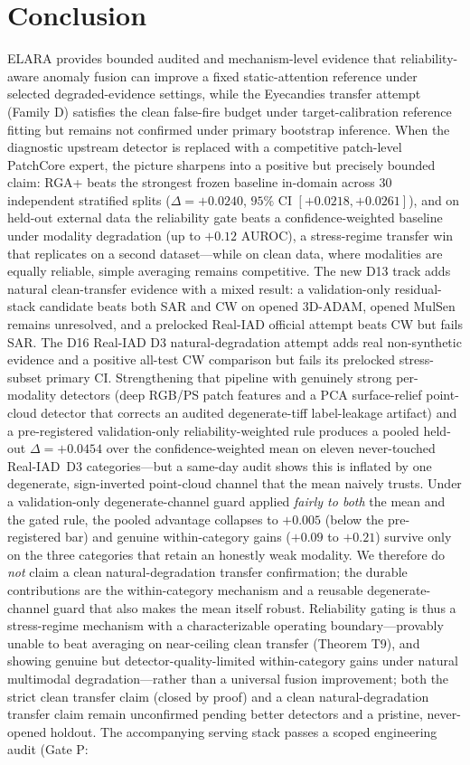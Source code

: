 \documentclass[10pt,conference]{IEEEtran}
\begin{document}
\section{Conclusion}
ELARA provides bounded audited and mechanism-level evidence that reliability-aware anomaly fusion can improve a fixed static-attention reference under selected degraded-evidence settings, while the Eyecandies transfer attempt (Family D) satisfies the clean false-fire budget under target-calibration reference fitting but remains not confirmed under primary bootstrap inference. When the diagnostic upstream detector is replaced with a competitive patch-level PatchCore expert, the picture sharpens into a positive but precisely bounded claim: RGA+ beats the strongest frozen baseline in-domain across $30$ independent stratified splits ($\Delta=+0.0240$, $95\%$ CI $[+0.0218,+0.0261]$), and on held-out external data the reliability gate beats a confidence-weighted baseline under modality degradation (up to $+0.12$ AUROC), a stress-regime transfer win that replicates on a second dataset---while on clean data, where modalities are equally reliable, simple averaging remains competitive. The new D13 track adds natural clean-transfer evidence with a mixed result: a validation-only residual-stack candidate beats both SAR and CW on opened 3D-ADAM, opened MulSen remains unresolved, and a prelocked Real-IAD official attempt beats CW but fails SAR. The D16 Real-IAD D3 natural-degradation attempt adds real non-synthetic evidence and a positive all-test CW comparison but fails its prelocked stress-subset primary CI. Strengthening that pipeline with genuinely strong per-modality detectors (deep RGB/PS patch features and a PCA surface-relief point-cloud detector that corrects an audited degenerate-tiff label-leakage artifact) and a pre-registered validation-only reliability-weighted rule produces a pooled held-out $\Delta=+0.0454$ over the confidence-weighted mean on eleven never-touched Real-IAD~D3 categories---but a same-day audit shows this is inflated by one degenerate, sign-inverted point-cloud channel that the mean naively trusts. Under a validation-only degenerate-channel guard applied \emph{fairly to both} the mean and the gated rule, the pooled advantage collapses to $+0.005$ (below the pre-registered bar) and genuine within-category gains ($+0.09$ to $+0.21$) survive only on the three categories that retain an honestly weak modality. We therefore do \emph{not} claim a clean natural-degradation transfer confirmation; the durable contributions are the within-category mechanism and a reusable degenerate-channel guard that also makes the mean itself robust. Reliability gating is thus a stress-regime mechanism with a characterizable operating boundary---provably unable to beat averaging on near-ceiling clean transfer (Theorem T9), and showing genuine but detector-quality-limited within-category gains under natural multimodal degradation---rather than a universal fusion improvement; both the strict clean transfer claim (closed by proof) and a clean natural-degradation transfer claim remain unconfirmed pending better detectors and a pristine, never-opened holdout. The accompanying serving stack passes a scoped engineering audit (Gate P: 
\end{document}
